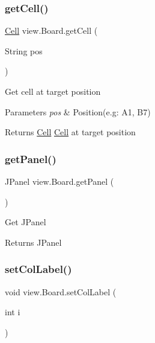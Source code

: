 \subsubsection{\texorpdfstring{getCell()}{getCell()}}
{\footnotesize\ttfamily \mbox{\hyperlink{classview_1_1_cell}{Cell}} view.\+Board.\+get\+Cell (\begin{DoxyParamCaption}\item[{String}]{pos }\end{DoxyParamCaption})\hspace{0.3cm}{\ttfamily [inline]}}

Get cell at target position


\begin{DoxyParams}{Parameters}
{\em pos} & Position(e.\+g\+: A1, B7) \\
\hline
\end{DoxyParams}
\begin{DoxyReturn}{Returns}
\mbox{\hyperlink{classview_1_1_cell}{Cell}} \mbox{\hyperlink{classview_1_1_cell}{Cell}} at target position 
\end{DoxyReturn}
\mbox{\label{classview_1_1_board_a20b01941d419f3a415ebf1e42bbfd84d}} 
\subsubsection{\texorpdfstring{getPanel()}{getPanel()}}
{\footnotesize\ttfamily J\+Panel view.\+Board.\+get\+Panel (\begin{DoxyParamCaption}{ }\end{DoxyParamCaption})\hspace{0.3cm}{\ttfamily [inline]}}

Get J\+Panel

\begin{DoxyReturn}{Returns}
J\+Panel 
\end{DoxyReturn}
\mbox{\label{classview_1_1_board_a485826c9e2feb7e266fc45d0dcb3c7d0}} 
\subsubsection{\texorpdfstring{setColLabel()}{setColLabel()}}
{\footnotesize\ttfamily void view.\+Board.\+set\+Col\+Label (\begin{DoxyParamCaption}\item[{int}]{i }\end{DoxyParamCaption})\hspace{0.3cm}{\ttfamily [inline]}}

